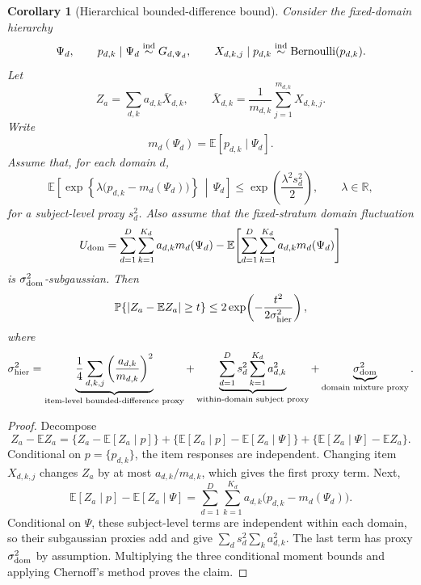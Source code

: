 \documentclass[11pt]{article}
\newcommand{\E}{\mathbb{E}}
\newcommand{\Pbb}{\mathbb{P}}
\newcommand{\R}{\mathbb{R}}
\newtheorem{corollary}[theorem]{Corollary}
\theoremstyle{definition}
\theoremstyle{remark}
\begin{document}
\begin{corollary}[Hierarchical bounded-difference bound]
\label{cor:fixed-stratum-hierarchical}
Consider the fixed-domain hierarchy
\[
    \Psi_d,
    \qquad
    p_{d,k}\mid\Psi_d\stackrel{\mathrm{ind}}{\sim}G_{d,\Psi_d},
    \qquad
    X_{d,k,j}\mid p_{d,k}\stackrel{\mathrm{ind}}{\sim}{\rm Bernoulli}(p_{d,k}).
\]
Let
\[
    Z_a=\sum_{d,k}a_{d,k}\bar X_{d,k},
    \qquad
    \bar X_{d,k}=\frac1{m_{d,k}}\sum_{j=1}^{m_{d,k}}X_{d,k,j}.
\]
Write
\[
    m_d(\Psi_d)=\E[p_{d,k}\mid\Psi_d].
\]
Assume that, for each domain \(d\),
\[
    \E\!\left[
        \exp\left\{
            \lambda\bigl(p_{d,k}-m_d(\Psi_d)\bigr)
        \right\}
        \,\middle|\,\Psi_d
    \right]
    \le
    \exp\!\left(\frac{\lambda^2 s_d^2}{2}\right),
    \qquad \lambda\in\R,
\]
for a subject-level proxy \(s_d^2\). Also assume that the fixed-stratum domain fluctuation
\[
    U_{\rm dom}
    =
    \sum_{d=1}^D\sum_{k=1}^{K_d} a_{d,k}m_d(\Psi_d)
    -
    \E\!\left[
        \sum_{d=1}^D\sum_{k=1}^{K_d} a_{d,k}m_d(\Psi_d)
    \right]
\]
is \(\sigma_{\rm dom}^2\)-subgaussian. Then
\[
    \Pbb\{|Z_a-\E Z_a|\ge t\}
    \le
    2\exp\!\left(
        -\frac{t^2}{2\sigma_{\rm hier}^2}
    \right),
\]
where
\[
    \sigma_{\rm hier}^2
    =
    \underbrace{
    \frac14
    \sum_{d,k,j}
    \left(\frac{a_{d,k}}{m_{d,k}}\right)^2
    }_{\text{item-level bounded-difference proxy}}
    +
    \underbrace{
    \sum_{d=1}^D
    s_d^2\sum_{k=1}^{K_d}a_{d,k}^2
    }_{\text{within-domain subject proxy}}
    +
    \underbrace{\sigma_{\rm dom}^2}_{\text{domain mixture proxy}}.
\]
\end{corollary}

\begin{proof}
Decompose
\[
    Z_a-\E Z_a
    =
    \{Z_a-\E[Z_a\mid p]\}
    +
    \{\E[Z_a\mid p]-\E[Z_a\mid\Psi]\}
    +
    \{\E[Z_a\mid\Psi]-\E Z_a\}.
\]
Conditional on \(p=\{p_{d,k}\}\), the item responses are independent.  Changing item \(X_{d,k,j}\) changes \(Z_a\) by at most \(a_{d,k}/m_{d,k}\), which gives the first proxy term.  Next,
\[
    \E[Z_a\mid p]-\E[Z_a\mid\Psi]
    =
    \sum_{d=1}^D\sum_{k=1}^{K_d}
    a_{d,k}\bigl(p_{d,k}-m_d(\Psi_d)\bigr).
\]
Conditional on \(\Psi\), these subject-level terms are independent within each domain, so their subgaussian proxies add and give \(\sum_d s_d^2\sum_k a_{d,k}^2\).  The last term has proxy \(\sigma_{\rm dom}^2\) by assumption.  Multiplying the three conditional moment bounds and applying Chernoff's method proves the claim.
\end{proof}
\end{document}
